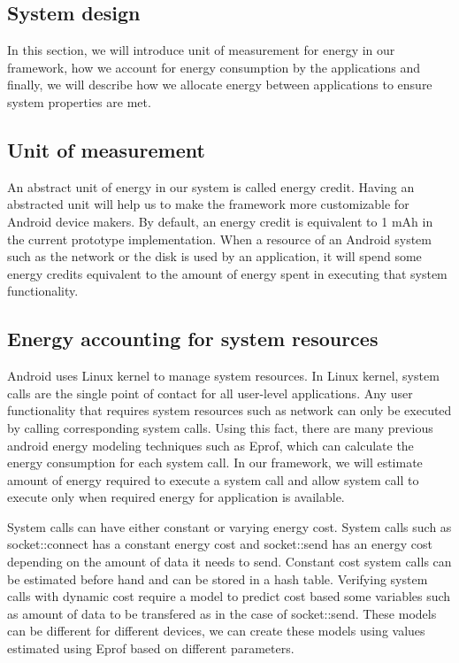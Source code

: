 \subsection{System design}


In this section, we will introduce unit of measurement for energy in our framework, how we account for energy consumption by the applications and finally, we will describe how we allocate energy between applications to ensure system properties are met.

\subsection{Unit of measurement}

An abstract unit of energy in our system is called energy credit. Having an abstracted unit will help us to make the framework more customizable for Android device makers. By default, an energy credit is equivalent to 1 mAh in the current prototype implementation. When a resource of an Android system such as the network or the disk is used by an application, it will spend some energy credits equivalent to the amount of energy spent in executing that system functionality.

\subsection{Energy accounting for system resources }

Android uses Linux kernel to manage system resources. In Linux kernel, system calls are the single point of contact for all user-level applications. Any user functionality that requires system resources such as network can only be executed by calling corresponding system calls. Using this fact, there are many previous android energy modeling techniques such as Eprof, which can calculate the energy consumption for each system call. In our framework, we will estimate amount of energy required to execute a system call and allow system call to execute only when required energy for application is available.

System calls can have either constant or varying energy cost. System calls such as socket::connect has a constant energy cost and socket::send has an energy cost depending on the amount of data it needs to send. Constant cost system calls can be estimated before hand and can be stored in a hash table. Verifying system calls with dynamic cost require a model to predict cost based some variables such as amount of data to be transfered as in the case of socket::send. These models can be different for different devices, we can create these models using values estimated using Eprof based on different parameters.

